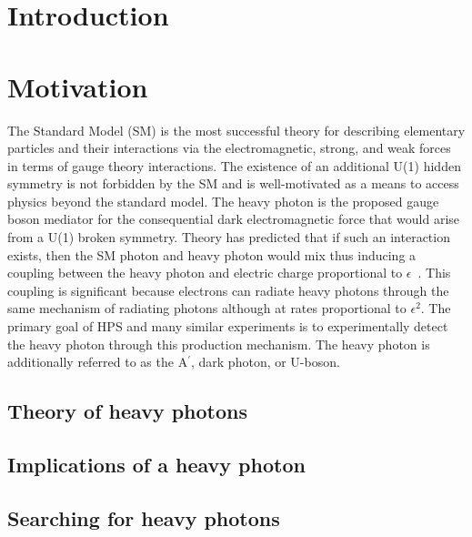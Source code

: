 \documentclass[12pt]{report}
\begin{document}
\afterpreface


\chapter{Introduction}


\chapter{Motivation} 
The Standard Model (SM) is the most successful theory for describing elementary particles and their interactions via the electromagnetic, strong, and weak forces in terms of gauge theory interactions. The existence of an additional U(1) hidden symmetry is not forbidden by the SM and is well-motivated as a means to access physics beyond the standard model. The heavy photon is the proposed gauge boson mediator for the consequential dark electromagnetic force that would arise from a U(1) broken symmetry. Theory has predicted that if such an interaction exists, then the SM photon and heavy photon would mix thus inducing a coupling between the heavy photon and electric charge proportional to $\epsilon$~\cite{holdom_two_1986}. This coupling is significant because electrons can radiate heavy photons through the same mechanism of radiating photons although at rates proportional to $\epsilon^2$. The primary goal of HPS and many similar experiments is to experimentally detect the heavy photon through this production mechanism. The heavy photon is additionally referred to as the A$^{\prime}$, dark photon, or U-boson.

\section{Theory of heavy photons}


\section{Implications of a heavy photon}
%

\section{Searching for heavy photons}

\end{document}
